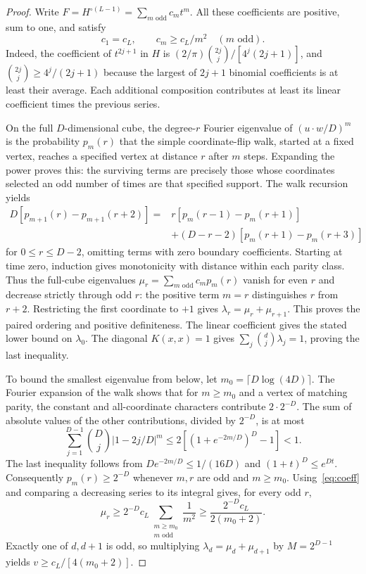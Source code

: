 \documentclass[11pt]{article}
\theoremstyle{remark}\newtheorem{remark}[theorem]{Remark}
\begin{document}
\begin{proof}
Write $F=H^{\circ(L-1)}=\sum_{m\text{ odd}}c_m t^m$.
All these coefficients are positive, sum to one, and satisfy
\begin{equation}\label{eq:coeff}
 c_1=c_L,\qquad c_m\ge c_L/m^2\quad(m\text{ odd}).
\end{equation}
Indeed, the coefficient of $t^{2j+1}$ in $H$ is
$(2/\pi)\binom{2j}{j}/[4^j(2j+1)]$, and
$\binom{2j}{j}\ge4^j/(2j+1)$ because the largest of $2j+1$
binomial coefficients is at least their average. Each additional
composition contributes at least its linear coefficient times the
previous series.

On the full $D$-dimensional cube, the degree-$r$ Fourier eigenvalue
of $(u\cdot w/D)^m$ is the probability $p_m(r)$ that the simple
coordinate-flip walk, started at a fixed vertex, reaches a specified
vertex at distance $r$ after $m$ steps. Expanding the power proves
this: the surviving terms are precisely those whose coordinates
selected an odd number of times are that specified support.
The walk recursion yields
\begin{align*}
 D[p_{m+1}(r)-p_{m+1}(r+2)]
 ={}&r[p_m(r-1)-p_m(r+1)]\\
 &+(D-r-2)[p_m(r+1)-p_m(r+3)]
\end{align*}
for $0\le r\le D-2$, omitting terms with zero boundary coefficients.
Starting at time zero, induction gives monotonicity with distance
within each parity class. Thus the full-cube eigenvalues
$\mu_r=\sum_{m\text{ odd}}c_mp_m(r)$ vanish for even $r$ and decrease
strictly through odd $r$: the positive term $m=r$ distinguishes
$r$ from $r+2$. Restricting the first coordinate to $+1$ gives
$\lambda_r=\mu_r+\mu_{r+1}$. This proves the paired ordering and
positive definiteness. The linear coefficient gives the stated
lower bound on $\lambda_0$. The diagonal $K(x,x)=1$ gives
$\sum_j\binom dj\lambda_j=1$, proving the last inequality.

To bound the smallest eigenvalue from below, let
$m_0=\lceil D\log(4D)\rceil$. The Fourier expansion of the walk
shows that for $m\ge m_0$ and a vertex of matching parity, the
constant and all-coordinate characters contribute $2\cdot2^{-D}$.
The sum of absolute values of the other contributions, divided by
$2^{-D}$, is at most
\[
 \sum_{j=1}^{D-1}\binom Dj|1-2j/D|^m
 \le 2[(1+e^{-2m/D})^D-1]<1.
\]
The last inequality follows from
$D e^{-2m/D}\le1/(16D)$ and $(1+t)^D\le e^{Dt}$.
Consequently $p_m(r)\ge2^{-D}$ whenever $m,r$ are odd and
$m\ge m_0$. Using~\eqref{eq:coeff} and comparing a decreasing
series to its integral gives, for every odd $r$,
\[
 \mu_r\ge 2^{-D}c_L\sum_{\substack{m\ge m_0\\m\text{ odd}}}\frac1{m^2}
 \ge\frac{2^{-D}c_L}{2(m_0+2)}.
\]
Exactly one of $d,d+1$ is odd, so multiplying
$\lambda_d=\mu_d+\mu_{d+1}$ by $M=2^{D-1}$ yields
$v\ge c_L/[4(m_0+2)]$.
\end{proof}
\end{document}
